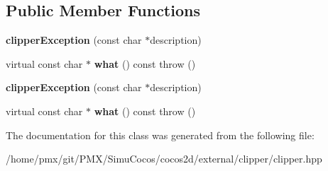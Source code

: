 \subsection*{Public Member Functions}
\begin{DoxyCompactItemize}
\item 
\mbox{\label{classClipperLib_1_1clipperException_a7d44b32d06cd870500355667f6e0d6ed}} 
{\bfseries clipper\+Exception} (const char $\ast$description)
\item 
\mbox{\label{classClipperLib_1_1clipperException_a32b7ac5a3176d9040ef0a863fd54657a}} 
virtual const char $\ast$ {\bfseries what} () const  throw ()
\item 
\mbox{\label{classClipperLib_1_1clipperException_a7d44b32d06cd870500355667f6e0d6ed}} 
{\bfseries clipper\+Exception} (const char $\ast$description)
\item 
\mbox{\label{classClipperLib_1_1clipperException_a32b7ac5a3176d9040ef0a863fd54657a}} 
virtual const char $\ast$ {\bfseries what} () const  throw ()
\end{DoxyCompactItemize}


The documentation for this class was generated from the following file\+:\begin{DoxyCompactItemize}
\item 
/home/pmx/git/\+P\+M\+X/\+Simu\+Cocos/cocos2d/external/clipper/clipper.\+hpp\end{DoxyCompactItemize}
